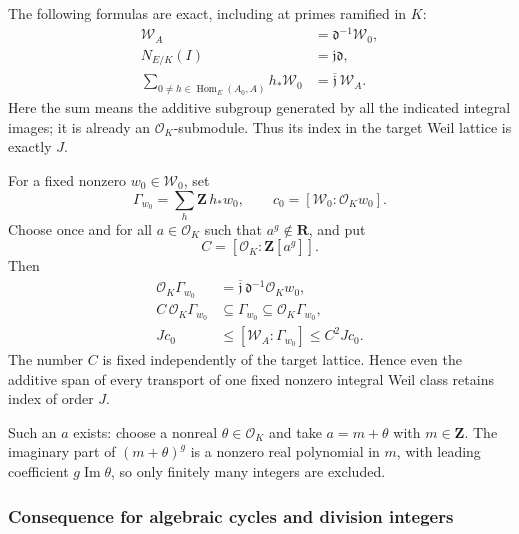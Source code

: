The following formulas are exact, including at primes ramified in \(K\): \[
 \begin{aligned}
 \mathscr W_A&=\mathfrak d^{-1}\mathscr W_0,\\
 N_{E/K}(I)&=\mathfrak j\mathfrak d,\\
 \sum_{0\ne h\in\operatorname{Hom}_E(A_0,A)}h_*\mathscr W_0
 &=\overline{\mathfrak j}\,\mathscr W_A.
 \end{aligned}
\tag{B23.3}
\] Here the sum means the additive subgroup generated by all the indicated integral images; it is already an \(\mathcal O_K\)-submodule. Thus its index in the target Weil lattice is exactly \(J\).

For a fixed nonzero \(w_0\in\mathscr W_0\), set \[
 \Gamma_{w_0}=\sum_{h}\mathbf Z\,h_*w_0,
 \qquad
 c_0=[\mathscr W_0:\mathcal O_Kw_0].
\] Choose once and for all \(a\in\mathcal O_K\) such that \(a^g\notin\mathbf R\), and put \[
 C=[\mathcal O_K:\mathbf Z[a^g]].
\tag{B23.4}
\] Then \[
 \begin{aligned}
 \mathcal O_K\Gamma_{w_0}
 &=\overline{\mathfrak j}\,\mathfrak d^{-1}\mathcal O_Kw_0,\\
 C\,\mathcal O_K\Gamma_{w_0}
 &\subseteq\Gamma_{w_0}
 \subseteq\mathcal O_K\Gamma_{w_0},\\
 Jc_0&\le[\mathscr W_A:\Gamma_{w_0}]\le C^2Jc_0.
 \end{aligned}
\tag{B23.5}
\] The number \(C\) is fixed independently of the target lattice. Hence even the additive span of every transport of one fixed nonzero integral Weil class retains index of order \(J\).

Such an \(a\) exists: choose a nonreal \(\theta\in\mathcal O_K\) and take \(a=m+\theta\) with \(m\in\mathbf Z\). The imaginary part of \((m+\theta)^g\) is a nonzero real polynomial in \(m\), with leading coefficient \(g\operatorname{Im}\theta\), so only finitely many integers are excluded.

\subsubsection{Consequence for algebraic cycles and division integers}\label{consequence-for-algebraic-cycles-and-division-integers}

